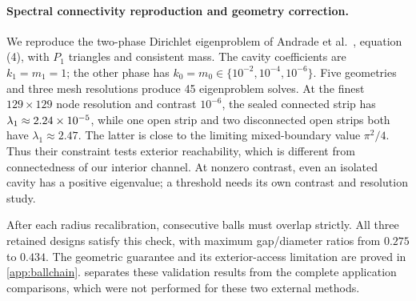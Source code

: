 \paragraph{Spectral connectivity reproduction and geometry correction.}
We reproduce the two-phase Dirichlet eigenproblem of
Andrade et al.~\cite{andrade2026connectivity}, equation (4), with $P_1$
triangles and consistent mass.  The cavity coefficients are $k_1=m_1=1$;
the other phase has $k_0=m_0\in\{10^{-2},10^{-4},10^{-6}\}$.
Five geometries and three mesh resolutions produce 45 eigenproblem solves.
At the finest $129\times129$ node resolution and contrast $10^{-6}$,
the sealed connected strip has $\lambda_1\approx2.24\times10^{-5}$, while
one open strip and two disconnected open strips both have
$\lambda_1\approx2.47$.  The latter is close to the limiting mixed-boundary
value $\pi^2/4$.  Thus their constraint tests exterior reachability, which is
different from connectedness of our interior channel.  At nonzero contrast,
even an isolated cavity has a positive eigenvalue; a threshold needs its own
contrast and resolution study.

After each radius recalibration, consecutive balls must overlap strictly. All three retained designs satisfy this check, with maximum gap/diameter ratios from $0.275$ to $0.434$. The geometric guarantee and its exterior-access limitation are proved in \cref{app:ballchain}.
 separates these validation results from the
complete application comparisons, which were not performed for these two external methods.
